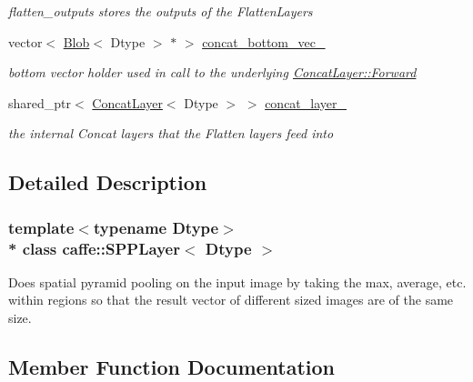 \begin{DoxyCompactItemize}
\begin{DoxyCompactList}\small\item\em flatten\+\_\+outputs stores the outputs of the Flatten\+Layers \end{DoxyCompactList}\item 
vector$<$ \hyperlink{classcaffe_1_1Blob}{Blob}$<$ Dtype $>$ $\ast$ $>$ \hyperlink{classcaffe_1_1SPPLayer_a2874ca5b0c4d8f7d970c5a30768d2bc0}{concat\+\_\+bottom\+\_\+vec\+\_\+}\hypertarget{classcaffe_1_1SPPLayer_a2874ca5b0c4d8f7d970c5a30768d2bc0}{}\label{classcaffe_1_1SPPLayer_a2874ca5b0c4d8f7d970c5a30768d2bc0}

\begin{DoxyCompactList}\small\item\em bottom vector holder used in call to the underlying \hyperlink{classcaffe_1_1Layer_aa5fc9ddb31b58958653372bdaaccde94}{Concat\+Layer\+::\+Forward} \end{DoxyCompactList}\item 
shared\+\_\+ptr$<$ \hyperlink{classcaffe_1_1ConcatLayer}{Concat\+Layer}$<$ Dtype $>$ $>$ \hyperlink{classcaffe_1_1SPPLayer_a02a9d50a48983fa0c6e42cafa85c1eb8}{concat\+\_\+layer\+\_\+}\hypertarget{classcaffe_1_1SPPLayer_a02a9d50a48983fa0c6e42cafa85c1eb8}{}\label{classcaffe_1_1SPPLayer_a02a9d50a48983fa0c6e42cafa85c1eb8}

\begin{DoxyCompactList}\small\item\em the internal Concat layers that the Flatten layers feed into \end{DoxyCompactList}\end{DoxyCompactItemize}


\subsection{Detailed Description}
\subsubsection*{template$<$typename Dtype$>$\\*
class caffe\+::\+S\+P\+P\+Layer$<$ Dtype $>$}

Does spatial pyramid pooling on the input image by taking the max, average, etc. within regions so that the result vector of different sized images are of the same size. 

\subsection{Member Function Documentation}
